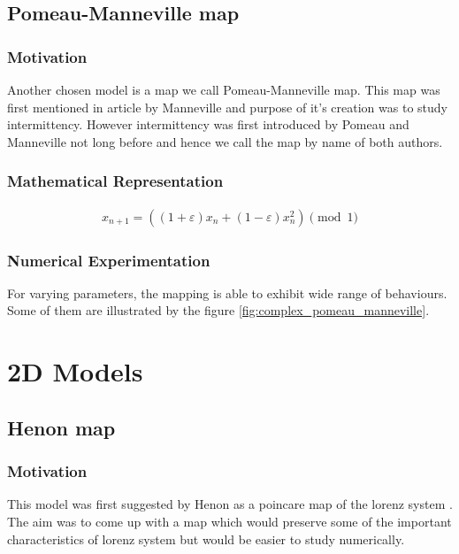 \subsection{Pomeau-Manneville map}

\subsubsection{Motivation}
Another chosen model is a map we call Pomeau-Manneville map.
This map was first mentioned in article by Manneville \cite{Manneville1980} and purpose of it's creation was to study intermittency.
However intermittency was first introduced by Pomeau and Manneville \cite{Pomeau1980} not long before \cite{Manneville1980} and hence we call the map by name of both authors.

\subsubsection{Mathematical Representation}

\begin{align}
    x_{n+1} = ((1 + \varepsilon) x_{n} + (1 - \varepsilon) x_{n}^2) \pmod{1}
\end{align}

\subsubsection{Numerical Experimentation}
For varying parameters, the mapping is able to exhibit wide range of behaviours.
Some of them are illustrated by the figure \ref{fig:complex_pomeau_manneville}.

\section{2D Models}

\subsection{Henon map}

\subsubsection{Motivation}

This model was first suggested by Henon \cite{Henon1976} as a poincare map of the lorenz system \cite{Lorenz2004}.
The aim was to come up with a map which would preserve some of the important characteristics of lorenz system but would be easier to study numerically.

